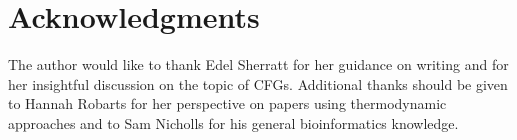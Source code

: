 \documentclass[journal]{IEEEtran}
\begin{document}

%


\appendices
%


\section*{Acknowledgments}
The author would like to thank Edel Sherratt for her guidance on writing and for her insightful discussion on the topic of CFGs. Additional thanks should be given to Hannah Robarts for her perspective on papers using thermodynamic approaches and to Sam Nicholls for his general bioinformatics knowledge.

\ifCLASSOPTIONcaptionsoff
  \newpage
\fi
\end{document}
